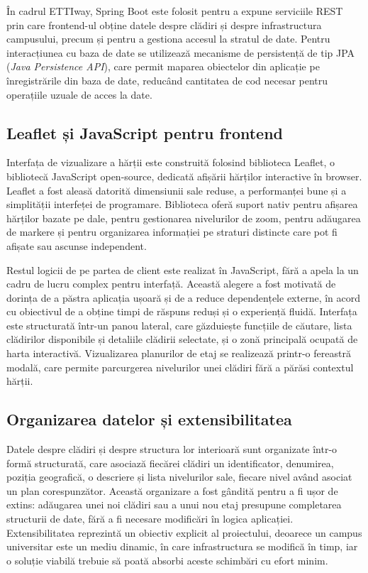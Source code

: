 În cadrul ETTIway, Spring Boot este folosit pentru a expune serviciile REST prin
care frontend-ul obține datele despre clădiri și despre infrastructura
campusului, precum și pentru a gestiona accesul la stratul de date. Pentru
interacțiunea cu baza de date se utilizează mecanisme de persistență de tip JPA
(\textit{Java Persistence API}), care permit maparea obiectelor din aplicație pe
înregistrările din baza de date, reducând cantitatea de cod necesar pentru
operațiile uzuale de acces la date.

\subsection{Leaflet și JavaScript pentru frontend}
\label{subsec:leaflet}

Interfața de vizualizare a hărții este construită folosind biblioteca Leaflet, o
bibliotecă JavaScript open-source, dedicată afișării hărților interactive în
browser. Leaflet a fost aleasă \cite{Leaflet} datorită dimensiunii sale reduse, a performanței
bune și a simplității interfeței de programare. Biblioteca oferă suport nativ
pentru afișarea hărților bazate pe dale, pentru gestionarea nivelurilor de zoom,
pentru adăugarea de markere și pentru organizarea informației pe straturi
distincte care pot fi afișate sau ascunse independent.

Restul logicii de pe partea de client este realizat în JavaScript, fără a apela
la un cadru de lucru complex pentru interfață. Această alegere a fost motivată de
dorința de a păstra aplicația ușoară și de a reduce dependențele externe, în
acord cu obiectivul de a obține timpi de răspuns reduși și o experiență
fluidă. Interfața este structurată într-un panou lateral, care găzduiește
funcțiile de căutare, lista clădirilor disponibile și detaliile clădirii
selectate, și o zonă principală ocupată de harta interactivă. Vizualizarea
planurilor de etaj se realizează printr-o fereastră modală, care permite
parcurgerea nivelurilor unei clădiri fără a părăsi contextul hărții.

\subsection{Organizarea datelor și extensibilitatea}
\label{subsec:organizare-date}

Datele despre clădiri și despre structura lor interioară sunt organizate
într-o formă structurată, care asociază fiecărei clădiri un identificator,
denumirea, poziția geografică, o descriere și lista nivelurilor sale, fiecare
nivel având asociat un plan corespunzător. Această organizare a fost gândită
pentru a fi ușor de extins: adăugarea unei noi clădiri sau a unui nou etaj
presupune completarea structurii de date, fără a fi necesare modificări în
logica aplicației. Extensibilitatea reprezintă un obiectiv explicit al
proiectului, deoarece un campus universitar este un mediu dinamic, în care
infrastructura se modifică în timp, iar o soluție viabilă trebuie să poată
absorbi aceste schimbări cu efort minim.

